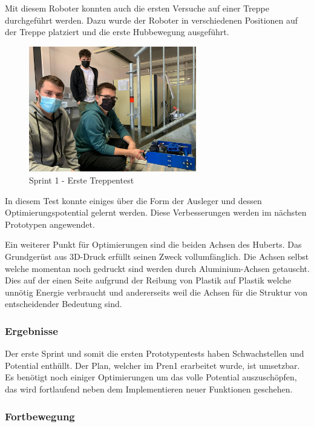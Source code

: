Mit diesem Roboter konnten auch die ersten Versuche auf einer Treppe durchgeführt werden. Dazu wurde der Roboter in verschiedenen Positionen auf der Treppe platziert und die erste Hubbewegung ausgeführt.

\begin{figure}[H]
  \includegraphics[width=0.65\textwidth]{img/Sprint1/pren1_sprint1_3.png}
  \centering
  \caption{Sprint 1 - Erste Treppentest}
  \label{fig:sprint-backlog-1}
\end{figure}

In diesem Test konnte einiges über die Form der Ausleger und dessen Optimierungspotential gelernt werden. Diese Verbesserungen werden im nächsten Prototypen angewendet.

Ein weiterer Punkt für Optimierungen sind die beiden Achsen des Huberts. Das Grundgerüst aus 3D-Druck erfüllt seinen Zweck vollumfänglich. Die Achsen selbst welche momentan noch gedruckt sind werden durch Aluminium-Achsen getauscht. Dies auf der einen Seite aufgrund der Reibung von Plastik auf Plastik welche unnötig Energie verbraucht und andererseits weil die Achsen für die Struktur von entscheidender Bedeutung sind. 

\subsubsection{Ergebnisse}

Der erste Sprint und somit die ersten Prototypentests haben Schwachstellen und Potential enthüllt. Der Plan, welcher im Pren1 erarbeitet wurde, ist umsetzbar. Es benötigt noch einiger Optimierungen um das volle Potential auszuschöpfen, das wird fortlaufend neben dem Implementieren neuer Funktionen geschehen.

\subsubsection{Fortbewegung}


